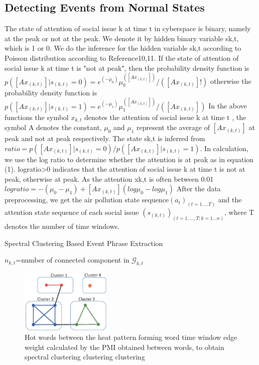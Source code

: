 \documentclass{sig-alternate-05-2015}
\begin{document}
\subsection{Detecting Events from Normal States}
The state of attention of social issue k at time t in cyberspace is binary, namely at the peak or not at the peak. We denote it by hidden binary variable sk,t, which is 1 or 0. We do the inference for the hidden variable sk,t according to Poisson distribution according to Reference10,11. If the state of attention of social issue k at time t is "not at peak", then the probability density function is 
\(p([Ax_(k,t) ]|s_(k,t)=0)=e^(-μ_0 )  μ_0^([Ax_(k,t)])/([Ax_(k,t)]!)\) otherwise the probability density function is \(p([Ax_(k,t) ]|s_(k,t)=1)=e^(-μ_1 )  μ_1^([Ax_(k,t)])/([Ax_(k,t)])\)
In the above functions the symbol \(x_{k,t}\) denotes the attention of social issue k at time t , the symbol A denotes the constant, \(μ_0\) and \(μ_1\) represent the average of \([Ax_(k,t)]\) at peak and not at peak respectively. The state sk,t is inferred from \(ratio=p([Ax_(k,t) ]|s_(k,t)=0)/p([Ax_(k,t) ]|s_(k,t)=1) \).
In calculation, we use the log ratio to determine whether the attention is at peak as in equation (1). logratio>0 indicates that the attention of social issue k at time t is not at peak, otherwise at peak. As the attention xk,t is often between 0.01%
	\(logratio=-(μ_0-μ_1 )+[Ax_(k,t)](log⁡μ_0 -log⁡μ_1)\)
After the data preprocessing, we get the air pollution state sequence\((a_t)_(t=1,…T)\) and the attention state sequence of each social issue \((s_(k,t))_(t=1,…,T;k=1…n)\), where T denotes the number of time windows.

\begin{algorithm}
\caption{Spectral Clustering Based Event Phrase Extraction}
\label{alg:eventKeywordsSearchMethod}
\(n_{k,t}\)=number of connected component in \(\mathcal{G}_{k,t}\)\\
\end{algorithm}


\begin{figure}
\centering
\includegraphics[height=3cm]{img/wordClusterGraph.eps}
\caption{Hot words between the heat pattern forming word time window edge weight calculated by the PMI obtained between words, to obtain spectral clustering clustering clustering}
\label{fig: windowsBurstyWordGraph}
\end{figure}
\end{document}
